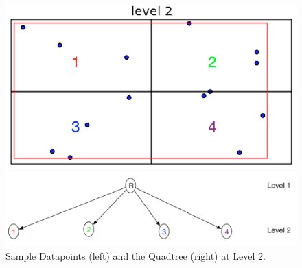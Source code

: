 \begin{figure}[H]
  \centering
  \vspace{0.5in}
  \begin{minipage}[b]{0.35\textwidth}
    \includegraphics[width=\textwidth]{Images/4Quad1_2}
  \end{minipage}
  \hfill
  \begin{minipage}[b]{0.6\textwidth}
    \includegraphics[width=\textwidth]{Images/1_1Quad_2_tree}
  \end{minipage}
  \vspace{0.5in}
  \caption{Sample Datapoints (left) and the Quadtree (right) at Level 2.}
  \label{fig:quad_4_2}
\end{figure}

